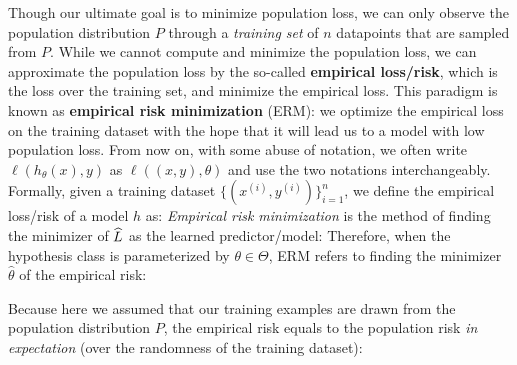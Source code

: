 
Though our ultimate goal is to minimize population loss, we can only observe the population distribution $P$ through a \emph{training set} of $n$ datapoints that are sampled from $P$.  While we cannot compute and minimize the population loss, we can approximate the population loss by the so-called \textbf{empirical loss/risk}, which is the loss over the training set, and minimize the empirical loss. This paradigm is known as \textbf{empirical risk minimization} (ERM): we optimize the empirical loss on the training dataset with the hope that it will lead us to a model with low
population loss. From now on, with some abuse of notation, we often write $\ell(h_\theta(x),y)$ as $\ell((x,y),\theta)$ and use the two notations interchangeably.  Formally, given a training dataset $\{(x^{(i)}, y^{(i)})\}_{i=1}^n$, we define the empirical loss/risk of a model $h$ as:
\emph{Empirical risk minimization} is the method of finding the minimizer of $\widehat{L}$ as the learned predictor/model:%
Therefore, when the hypothesis class is parameterized by $\theta\in \Theta$, ERM refers to finding the minimizer $\hat{\theta}$ of the empirical risk:

Because here we assumed that our training examples are drawn from the population distribution $P$, the empirical risk equals to the population risk 
\emph{in expectation} (over the randomness of the training dataset):



